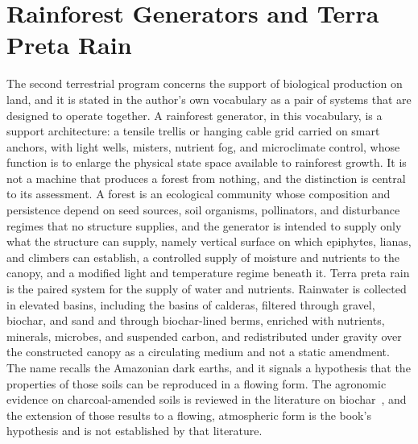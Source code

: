 \chapter{Rainforest Generators and Terra Preta Rain}
\label{ch:19}

The second terrestrial program concerns the support of biological production on land, and it is stated in the author's own vocabulary as a pair of systems that are designed to operate together. A rainforest generator, in this vocabulary, is a support architecture: a tensile trellis or hanging cable grid carried on smart anchors, with light wells, misters, nutrient fog, and microclimate control, whose function is to enlarge the physical state space available to rainforest growth. It is not a machine that produces a forest from nothing, and the distinction is central to its assessment. A forest is an ecological community whose composition and persistence depend on seed sources, soil organisms, pollinators, and disturbance regimes that no structure supplies, and the generator is intended to supply only what the structure can supply, namely vertical surface on which epiphytes, lianas, and climbers can establish, a controlled supply of moisture and nutrients to the canopy, and a modified light and temperature regime beneath it. Terra preta rain is the paired system for the supply of water and nutrients. Rainwater is collected in elevated basins, including the basins of calderas, filtered through gravel, biochar, and sand and through biochar-lined berms, enriched with nutrients, minerals, microbes, and suspended carbon, and redistributed under gravity over the constructed canopy as a circulating medium and not a static amendment. The name recalls the Amazonian dark earths, and it signals a hypothesis that the properties of those soils can be reproduced in a flowing form. The agronomic evidence on charcoal-amended soils is reviewed in the literature on biochar~\cite{lehmann2006}, and the extension of those results to a flowing, atmospheric form is the book's hypothesis and is not established by that literature.

